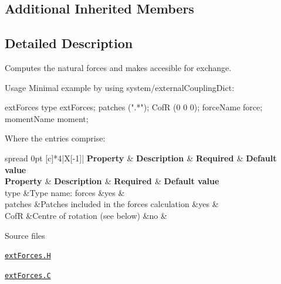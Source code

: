 \subsection*{Additional Inherited Members}


\subsection{Detailed Description}
Computes the natural forces and makes accesible for exchange. 

\label{_Description}%
 \begin{DoxyParagraph}{Usage}
Minimal example by using {\ttfamily system/external\+Coupling\+Dict}\+: \begin{DoxyVerb}extForces
{
    type extForces;
    patches (".*");
    CofR  (0 0 0);
    forceName force;
    momentName moment;
}
\end{DoxyVerb}
 \begin{DoxyVerb}Where the entries comprise:
\end{DoxyVerb}
 \tabulinesep=1mm
\begin{longtabu} spread 0pt [c]{*{4}{|X[-1]}|}
\hline
\rowcolor{\tableheadbgcolor}\PBS\centering \textbf{ {\bfseries  Property } }&\PBS\centering \textbf{ {\bfseries  Description } }&\PBS\centering \textbf{ {\bfseries  Required } }&\PBS\centering \textbf{ {\bfseries  Default value}  }\\
\endfirsthead
\hline
\endfoot
\hline
\rowcolor{\tableheadbgcolor}\PBS\centering \textbf{ {\bfseries  Property } }&\PBS\centering \textbf{ {\bfseries  Description } }&\PBS\centering \textbf{ {\bfseries  Required } }&\PBS\centering \textbf{ {\bfseries  Default value}  }\\
\endhead
{\ttfamily type}  &Type name\+: forces  &yes  &\\
{\ttfamily patches}  &Patches included in the forces calculation  &yes  &\\
{\ttfamily CofR}  &Centre of rotation (see below)  &no  &\\
\end{longtabu}

\end{DoxyParagraph}
\begin{DoxyParagraph}{Source files}

\begin{DoxyItemize}
\item \href{../../../home/carlo/data/GeN-Foam/GeN-Foam_ffn/GeN-Foam/GeN-Foam/FMU4FOAM/ECI4FOAM/src/externalComm/externalIO/output/extForces/extForces.H}{\tt ext\+Forces.\+H} 
\item \href{../../../home/carlo/data/GeN-Foam/GeN-Foam_ffn/GeN-Foam/GeN-Foam/FMU4FOAM/ECI4FOAM/src/externalComm/externalIO/output/extForces/extForces.C}{\tt ext\+Forces.\+C} 
\end{DoxyItemize}
\end{DoxyParagraph}


